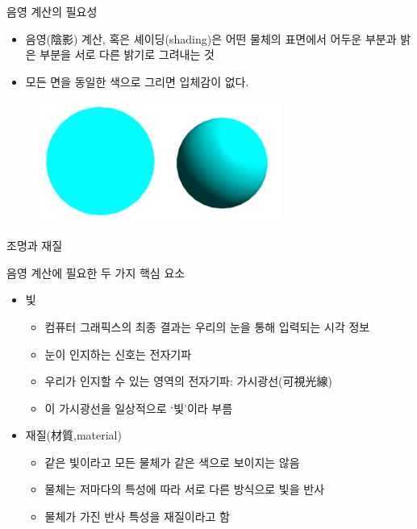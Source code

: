 \begin{frame}[fragile]{음영 계산의 필요성}

\begin{itemize}
\item 음영(陰影) 계산, 혹은 셰이딩(shading)은 어떤 물체의 표면에서 어두운 부분과 밝은 부분을 서로 다른 밝기로 그려내는 것
\item 모든 면을 동일한 색으로 그리면 입체감이 없다.
\end{itemize}

\begin{figure}[h!]
  \centering
    \includegraphics[height=4cm]{Math_lighting/shading.png}
\end{figure}

\end{frame}

\begin{frame}[fragile]{조명과 재질}

음영 계산에 필요한 두 가지 핵심 요소
\begin{itemize}
\item 빛
	\begin{itemize}
	\item 컴퓨터 그래픽스의 최종 결과는 우리의 눈을 통해 입력되는 시각 정보
	\item 눈이 인지하는 신호는 전자기파
	\item 우리가 인지할 수 있는 영역의 전자기파: 가시광선(可視光線)
	\item 이 가시광선을 일상적으로 `빛'이라 부름
	\end{itemize}
\item 재질(材質,material)
	\begin{itemize}
	\item 같은 빛이라고 모든 물체가 같은 색으로 보이지는 않음
	\item 물체는 저마다의 특성에 따라 서로 다른 방식으로 빛을 반사
	\item 물체가 가진 반사 특성을 재질이라고 함
	\end{itemize}
\end{itemize}

\end{frame}

